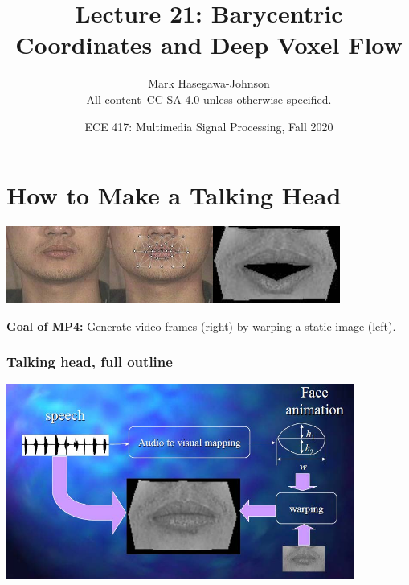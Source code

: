 \documentclass{beamer}
\title{Lecture 21: Barycentric Coordinates and Deep Voxel Flow}
\author{Mark Hasegawa-Johnson\\All content~\href{https://creativecommons.org/licenses/by-sa/4.0/}{CC-SA 4.0} unless otherwise specified.}
\date{ECE 417: Multimedia Signal Processing, Fall 2020}
\institute{University of Illinois}
\begin{document}
\begin{frame}
  \maketitle
\end{frame}

\begin{frame}
  \tableofcontents
\end{frame}

\section{How to Make a Talking Head}
\setcounter{subsection}{1}

\begin{frame}
  \centerline{\includegraphics[height=1in]{mp7_image_warping_points.jpg}\includegraphics[height=1in]{mp7_image_warped.jpg}}
  {\bf Goal of MP4:} Generate video frames (right) by warping a static image (left).
\end{frame}

\begin{frame}
  \frametitle{Talking head, full outline}
  \centerline{\includegraphics[width=4.5in]{mp7_image_warping.jpg}}
\end{frame}
\end{document}

